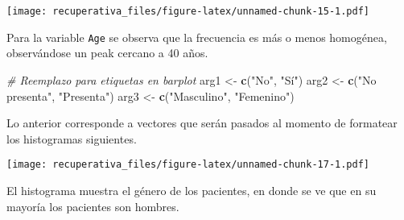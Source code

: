 \documentclass[
  spanish,
]{article}
\newenvironment{Shaded}{\begin{snugshade}}{\end{snugshade}}
\newcommand{\CommentTok}[1]{\textcolor[rgb]{0.56,0.35,0.01}{\textit{#1}}}
\newcommand{\DataTypeTok}[1]{\textcolor[rgb]{0.13,0.29,0.53}{#1}}
\newcommand{\KeywordTok}[1]{\textcolor[rgb]{0.13,0.29,0.53}{\textbf{#1}}}
\newcommand{\NormalTok}[1]{#1}
\newcommand{\OperatorTok}[1]{\textcolor[rgb]{0.81,0.36,0.00}{\textbf{#1}}}
\newcommand{\StringTok}[1]{\textcolor[rgb]{0.31,0.60,0.02}{#1}}
\begin{document}
\begin{Shaded}
\end{Shaded}

\texttt{[image: recuperativa\_files/figure-latex/unnamed-chunk-15-1.pdf]}

Para la variable \texttt{Age} se observa que la frecuencia es más o
menos homogénea, observándose un peak cercano a 40 años.

\begin{Shaded}
\begin{Highlighting}[]
\CommentTok{\# Reemplazo para etiquetas en barplot}
\NormalTok{arg1 \textless{}{-}}\StringTok{ }\KeywordTok{c}\NormalTok{(}\StringTok{"No"}\NormalTok{, }\StringTok{"Sí"}\NormalTok{)}
\NormalTok{arg2 \textless{}{-}}\StringTok{ }\KeywordTok{c}\NormalTok{(}\StringTok{"No presenta"}\NormalTok{, }\StringTok{"Presenta"}\NormalTok{)}
\NormalTok{arg3 \textless{}{-}}\StringTok{ }\KeywordTok{c}\NormalTok{(}\StringTok{"Masculino"}\NormalTok{, }\StringTok{"Femenino"}\NormalTok{)}
\end{Highlighting}
\end{Shaded}

Lo anterior corresponde a vectores que serán pasados al momento de
formatear los histogramas siguientes.

\begin{Shaded}
\end{Shaded}

\texttt{[image: recuperativa\_files/figure-latex/unnamed-chunk-17-1.pdf]}

El histograma muestra el género de los pacientes, en donde se ve que en
su mayoría los pacientes son hombres.

\begin{Shaded}
\end{Shaded}
\end{document}
